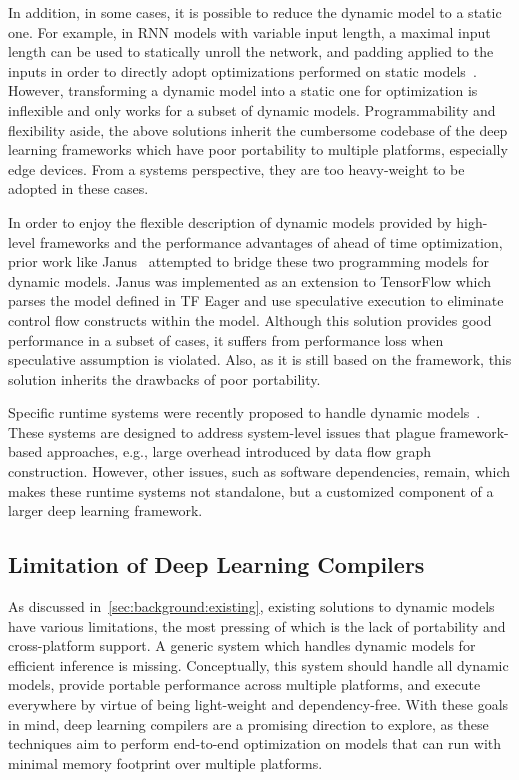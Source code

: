 In addition, in some cases, it is possible to reduce the dynamic model to a static one. For example, in RNN models with variable input length, a maximal input length can be used to statically unroll the network, and padding applied to the inputs in order to directly adopt optimizations performed on static models~\citep{zhang2018deepcpu}. However, transforming a dynamic model into a static one for optimization is inflexible and only works for a subset of dynamic models. Programmability and flexibility aside, the above solutions inherit the cumbersome codebase of the deep learning frameworks which have poor portability to multiple platforms, especially edge devices. From a systems perspective, they are too heavy-weight to be adopted in these cases.

In order to enjoy the flexible description of dynamic models provided by high-level frameworks and the performance advantages of ahead of time optimization, prior work like Janus~\citep{jeong2019janus} attempted to bridge these two programming models for dynamic models.
Janus was implemented as an extension to TensorFlow which parses the model defined in TF Eager and use speculative execution to eliminate control flow constructs within the model.
Although this solution provides good performance in a subset of cases, it suffers from performance loss when speculative assumption is violated.
Also, as it is still based on the framework, this solution inherits the drawbacks of poor portability.

Specific runtime systems were recently proposed to handle dynamic models~\citep{xu2018cavs, gao2018low}. These systems are designed to address system-level issues that plague framework-based approaches, e.g., large overhead introduced by data flow graph construction.
However, other issues, such as software dependencies, remain, which makes these runtime systems not standalone, but a customized component of a larger deep learning framework.

\subsection{Limitation of Deep Learning Compilers}
\label{sec:background:dlc}
As discussed in~\ref{sec:background:existing}, existing solutions to dynamic models have various limitations, the most pressing of which is the lack of portability and cross-platform support.
A generic system which handles dynamic models for efficient inference is missing.
Conceptually, this system should handle all dynamic models, provide portable performance across multiple platforms, and execute everywhere by virtue of being light-weight and dependency-free.
With these goals in mind, deep learning compilers are a promising direction to explore, as these techniques aim to perform end-to-end optimization on models that can run with minimal memory footprint over multiple platforms.


